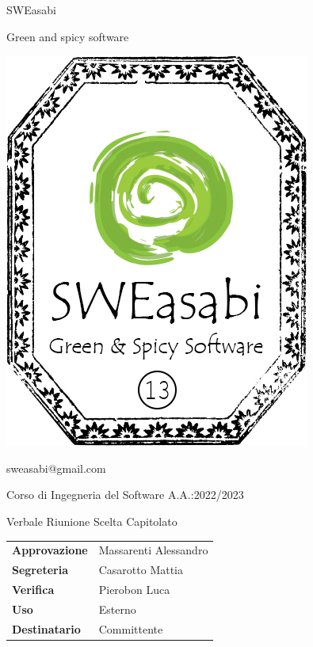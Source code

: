 \documentclass{article}
\begin{document}
\begin{center}
\begin{center}
\begin{minipage}{0.49\linewidth}
\begin{flushright}
\begin{minipage}{0.5\linewidth}
\begin{center}
            \Large SWEasabi
    
            \tiny Green and spicy software
    
            \includegraphics[width=0.67\linewidth]{../../../assets_globali/img/logo_13.png}
            
            \small sweasabi@gmail.com
    
            \end{center}
            \end{minipage}
            \end{flushright}
        \end{minipage}
    \end{center}

    \vspace{2cm}

    \normalsize Corso di Ingegneria del Software A.A.:2022/2023
    
    \Huge Verbale Riunione Scelta Capitolato
        
    \vspace{2cm}
    
    \normalsize
    \begin{center}
        \begin{tabularx}{7cm}{l | X}            
            \textbf{Approvazione} & Massarenti Alessandro\\
            \textbf{Segreteria} & Casarotto Mattia\\
            \textbf{Verifica} & Pierobon Luca\\
            \hline
            \textbf{Uso} & Esterno\\
            \textbf{Destinatario} & Committente\\
        \end{tabularx}
    \end{center}
        
\end{center}
\end{document}
